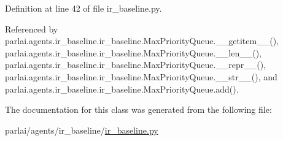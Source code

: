 Definition at line 42 of file ir\+\_\+baseline.\+py.



Referenced by parlai.\+agents.\+ir\+\_\+baseline.\+ir\+\_\+baseline.\+Max\+Priority\+Queue.\+\_\+\+\_\+getitem\+\_\+\+\_\+(), parlai.\+agents.\+ir\+\_\+baseline.\+ir\+\_\+baseline.\+Max\+Priority\+Queue.\+\_\+\+\_\+len\+\_\+\+\_\+(), parlai.\+agents.\+ir\+\_\+baseline.\+ir\+\_\+baseline.\+Max\+Priority\+Queue.\+\_\+\+\_\+repr\+\_\+\+\_\+(), parlai.\+agents.\+ir\+\_\+baseline.\+ir\+\_\+baseline.\+Max\+Priority\+Queue.\+\_\+\+\_\+str\+\_\+\+\_\+(), and parlai.\+agents.\+ir\+\_\+baseline.\+ir\+\_\+baseline.\+Max\+Priority\+Queue.\+add().



The documentation for this class was generated from the following file\+:\begin{DoxyCompactItemize}
\item 
parlai/agents/ir\+\_\+baseline/\hyperlink{ir__baseline_8py}{ir\+\_\+baseline.\+py}\end{DoxyCompactItemize}
